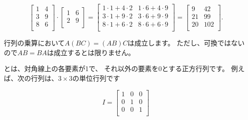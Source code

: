 \begin{center}
\end{center}

\[
 \begin{bmatrix}
  1 & 4 \\
  3 & 9 \\
  8 & 6 \\
 \end{bmatrix}
\cdot
 \begin{bmatrix}
  1 & 6 \\
  2 & 9 \\
 \end{bmatrix}
=
 \begin{bmatrix}
  1 \cdot 1 + 4 \cdot 2 & 1 \cdot 6 + 4 \cdot 9 \\
  3 \cdot 1 + 9 \cdot 2 & 3 \cdot 6 + 9 \cdot 9 \\
  8 \cdot 1 + 6 \cdot 2 & 8 \cdot 6 + 6 \cdot 9 \\
 \end{bmatrix}
=
 \begin{bmatrix}
  9 & 42 \\
  21 & 99 \\
  20 & 102 \\
 \end{bmatrix}.
\]

行列の乗算において$A(BC)=(AB)C$は成立します。
ただし、可換ではないので$AB=BA$は成立するとは限りません。


とは、対角線上の各要素が1で、
それ以外の要素を0とする正方行列です。
例えば、次の行列は、$3 \times 3$の単位行列です

\[
 I = \begin{bmatrix}
  1 & 0 & 0 \\
  0 & 1 & 0 \\
  0 & 0 & 1 \\
 \end{bmatrix}
\]

